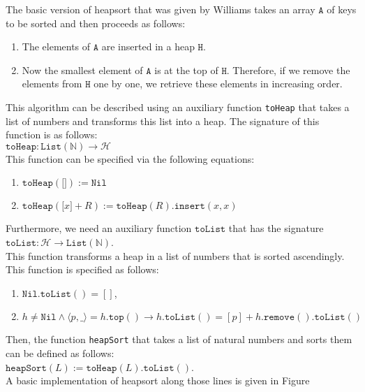The basic version of heapsort that was given by Williams takes an array $\texttt{A}$ of keys to be sorted and
then proceeds as follows:
\begin{enumerate}
\item The elements of $\texttt{A}$ are inserted in a heap $\texttt{H}$.
\item Now the smallest element of $\texttt{A}$ is at the top of $\texttt{H}$.  Therefore, if we remove the elements
      from $\texttt{H}$ one by one, we retrieve these elements in increasing order.
\end{enumerate}
This algorithm can be described using an auxiliary function \texttt{toHeap} that takes a list of numbers and
transforms this list into a heap.  The signature of this function is as follows:
\\[0.2cm]
\hspace*{1.3cm}
$\texttt{toHeap}: \texttt{List}(\mathbb{N}) \rightarrow \mathcal{H}$
\\[0.2cm]
This function can be specified via the following equations:
\begin{enumerate}
\item $\texttt{toHeap}(\texttt{[]}) := \texttt{Nil}$
\item $\texttt{toHeap}(\texttt{[}x\texttt{]} + R) := \texttt{toHeap}(R).\texttt{insert}(x, x)$
\end{enumerate}
Furthermore, we need an auxiliary function $\texttt{toList}$ that has the signature
\\[0.2cm]
\hspace*{1.3cm}
$\texttt{toList}: \mathcal{H} \rightarrow \texttt{List}(\mathbb{N})$.
\\[0.2cm]
This function transforms a heap in a list of numbers that is sorted ascendingly.  This function is specified as
follows:
\begin{enumerate}
\item $\texttt{Nil}.\texttt{toList}() = []$,
\item $h \not= \texttt{Nil} \wedge \langle p, \_ \rangle = h.\texttt{top}() \rightarrow h.\texttt{toList}() = [p] + h.\texttt{remove}().\texttt{toList}()$
\end{enumerate}
Then, the function \texttt{heapSort} that takes a list of natural numbers and sorts them can be defined as follows:
\\[0.2cm]
\hspace*{1.3cm}
$\texttt{heapSort}(L) := \texttt{toHeap}(L).\texttt{toList}()$.
\\[0.2cm]
A basic implementation of heapsort along those lines is given in Figure
